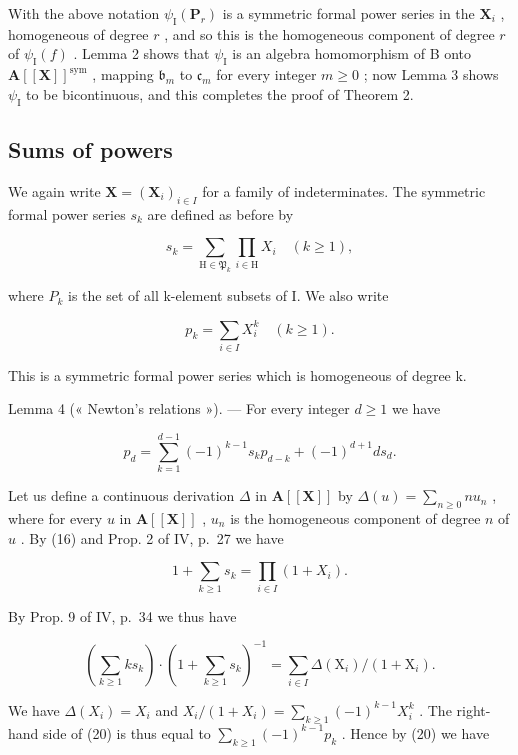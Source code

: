 With the above notation \(\psi_{\mathrm{I}}(\mathbf{P}_{r})\) is a symmetric formal power series in the \(\mathbf{X}_i\) , homogeneous of degree \(r\) , and so this is the homogeneous component of degree \(r\) of \(\psi_{\mathrm{I}}(f)\) . Lemma 2 shows that \(\psi_{\mathrm{I}}\) is an algebra homomorphism of B onto \(\mathbf{A}[[\mathbf{X}]]^{\mathrm{sym}}\) , mapping \(\mathfrak{b}_m\) to \(\mathfrak{c}_m\) for every integer \(m \geqslant 0\) ; now Lemma 3 shows \(\psi_{\mathrm{I}}\) to be bicontinuous, and this completes the proof of Theorem 2.

\subsection{Sums of powers}

We again write \(\mathbf{X} = (\mathbf{X}_{i})_{i \in I}\) for a family of indeterminates. The symmetric formal power series \(s_{k}\) are defined as before by

\[
s _ {k} = \sum_ {\mathrm{H} \in \mathfrak {P} _ {k}} \prod_ {i \in \mathrm{H}} X _ {i} \quad (k \geqslant 1),\tag{16}
\]

where \(P_{k}\) is the set of all k-element subsets of I. We also write

\[
p _ {k} = \sum_ {i \in I} X _ {i} ^ {k} \quad (k \geqslant 1).\tag{17}
\]

This is a symmetric formal power series which is homogeneous of degree k.

Lemma 4 (« Newton's relations »). --- For every integer \(d \geqslant 1\) we have

\[
p _ {d} = \sum_ {k = 1} ^ {d - 1} (- 1) ^ {k - 1} s _ {k} p _ {d - k} + (- 1) ^ {d + 1} d s _ {d}.\tag{18}
\]

Let us define a continuous derivation \(\Delta\) in \(\mathbf{A}[[\mathbf{X}]]\) by \(\Delta(u) = \sum_{n \geq 0} nu_n\) , where for every \(u\) in \(\mathbf{A}[[\mathbf{X}]]\) , \(u_n\) is the homogeneous component of degree \(n\) of \(u\) . By (16) and Prop. 2 of IV, p.~27 we have

\[
1 + \sum_ {k \geqslant 1} s _ {k} = \prod_ {i \in I} (1 + X _ {i}).\tag{19}
\]

By Prop. 9 of IV, p.~34 we thus have

\[
\left(\sum_ {k \geqslant 1} k s _ {k}\right) \cdot \left(1 + \sum_ {k \geqslant 1} s _ {k}\right) ^ {- 1} = \sum_ {i \in I} \Delta \left(\mathrm{X} _ {i}\right) / \left(1 + \mathrm{X} _ {i}\right).\tag{20}
\]

We have \(\Delta(X_i) = X_i\) and \(X_i / (1 + X_i) = \sum_{k \geq 1} (-1)^{k-1} X_i^k\) . The right-hand side of (20) is thus equal to \(\sum_{k \geq 1} (-1)^{k-1} p_k\) . Hence by (20) we have

